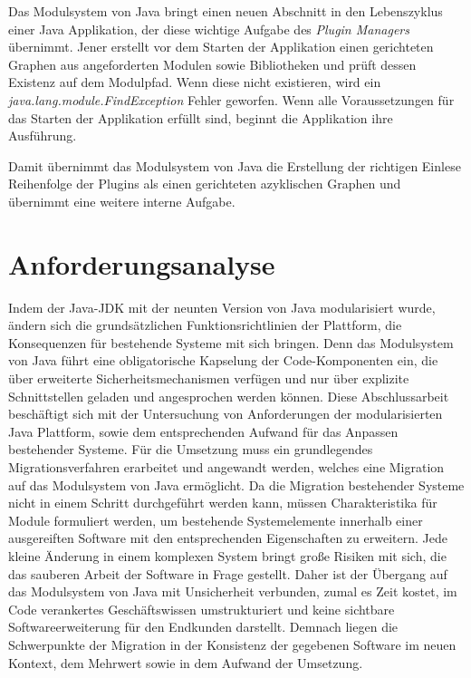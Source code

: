 		Das Modulsystem von Java bringt einen neuen Abschnitt in den Lebenszyklus einer Java Applikation, der diese wichtige Aufgabe des \textit{Plugin Managers} übernimmt. Jener erstellt vor dem Starten der Applikation einen gerichteten Graphen aus angeforderten Modulen sowie Bibliotheken und prüft dessen Existenz auf dem Modulpfad. Wenn diese nicht existieren, wird ein \textit{java.lang.module.FindException} Fehler geworfen. Wenn alle Voraussetzungen für das Starten der Applikation erfüllt sind, beginnt die Applikation ihre Ausführung. \bigbreak

		Damit übernimmt das Modulsystem von Java die Erstellung der richtigen Einlese Reihenfolge der Plugins als einen gerichteten azyklischen Graphen und übernimmt eine weitere interne Aufgabe.

\section{Anforderungsanalyse} 
	Indem der Java-JDK mit der neunten Version von Java modularisiert wurde, ändern sich die grundsätzlichen Funktionsrichtlinien der Plattform, die Konsequenzen für bestehende Systeme mit sich bringen. Denn das Modulsystem von Java führt eine obligatorische Kapselung der Code-Komponenten ein, die über erweiterte Sicherheitsmechanismen verfügen und nur über explizite Schnittstellen geladen und angesprochen werden können.\newline 
	Diese Abschlussarbeit beschäftigt sich mit der Untersuchung von Anforderungen der modularisierten Java Plattform, sowie dem entsprechenden Aufwand für das Anpassen bestehender Systeme. \newline
	Für die Umsetzung muss ein grundlegendes Migrationsverfahren erarbeitet und angewandt werden, welches eine Migration auf das Modulsystem von Java ermöglicht. Da die Migration bestehender Systeme nicht in einem Schritt durchgeführt werden kann, müssen Charakteristika für Module formuliert werden, um bestehende Systemelemente innerhalb einer ausgereiften Software mit den entsprechenden Eigenschaften zu erweitern.\newline
	Jede kleine Änderung in einem komplexen System bringt große Risiken mit sich, die das sauberen Arbeit der Software in Frage gestellt. Daher ist der Übergang auf das Modulsystem von Java mit Unsicherheit verbunden, zumal es Zeit kostet, im Code verankertes Geschäftswissen umstrukturiert und keine sichtbare Softwareerweiterung für den Endkunden darstellt. Demnach liegen die Schwerpunkte der Migration in der Konsistenz der gegebenen Software im neuen Kontext, dem Mehrwert sowie in dem Aufwand der Umsetzung. \bigbreak

